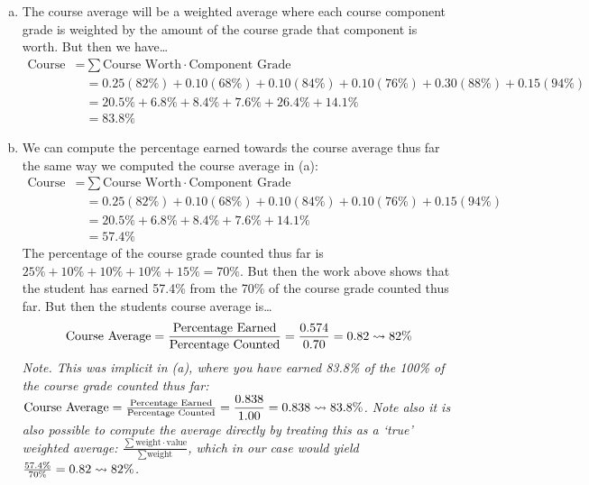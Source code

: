 \documentclass[11pt,letterpaper]{article}
\begin{document}
{\small
\sol 
\begin{enumerate}[(a)]
\item The course average will be a weighted average where each course component grade is weighted by the amount of the course grade that component is worth. But then we have\dots
	\[
	\begin{aligned}
	\text{Course Grade}=& \sum \text{Course Worth} \cdot \text{Component Grade} \\
	&= 0.25 (82\%) + 0.10 (68\%) + 0.10 (84\%) + 0.10 (76\%) + 0.30 (88\%) + 0.15 (94\%) \\
	&= 20.5\% + 6.8\% + 8.4\% + 7.6\% + 26.4\% + 14.1\% \\
	&= 83.8\%
	\end{aligned}
	\]

\item We can compute the percentage earned towards the course average thus far the same way we computed the course average in (a):
	\[
	\begin{aligned}
	\text{Course Grade}=& \sum \text{Course Worth} \cdot \text{Component Grade} \\
	&= 0.25 (82\%) + 0.10 (68\%) + 0.10 (84\%) + 0.10 (76\%) + 0.15 (94\%) \\
	&= 20.5\% + 6.8\% + 8.4\% + 7.6\% + 14.1\% \\
	&= 57.4\%
	\end{aligned}
	\]
The percentage of the course grade counted thus far is $25\% + 10\% + 10\% + 10\% + 15\%= 70\%$. But then the work above shows that the student has earned 57.4\% from the 70\% of the course grade counted thus far. But then the students course average is\dots
	\[
	\text{Course Average}= \dfrac{\text{Percentage Earned}}{\text{Percentage Counted}}= \dfrac{0.574}{0.70}= 0.82 \rightsquigarrow 82\%
	\]
{\itshape Note. This was implicit in (a), where you have earned 83.8\% of the 100\% of the course grade counted thus far: $\text{Course Average}= \frac{\text{Percentage Earned}}{\text{Percentage Counted}}= \dfrac{0.838}{1.00}= 0.838 \rightsquigarrow 83.8\%$. Note also it is also possible to compute the average directly by treating this as a `true' weighted average: $\frac{\sum \text{weight} \cdot \text{value}}{\sum \text{weight}}$, which in our case would yield $\frac{57.4\%}{70\%}= 0.82 \rightsquigarrow 82\%$.}
\end{enumerate}
}



\newpage
\end{document}
